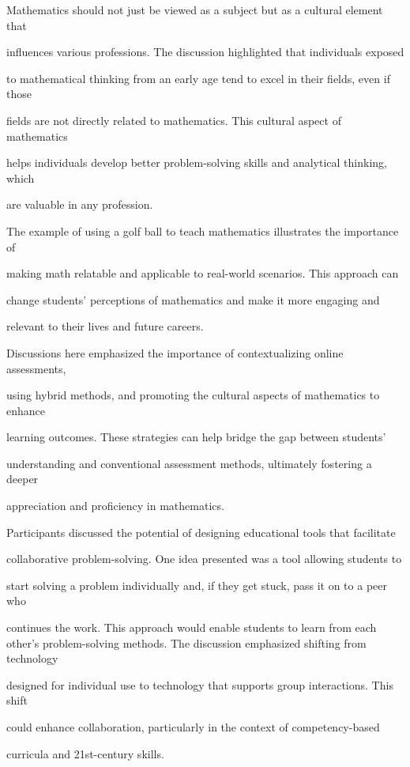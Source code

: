 \documentclass[11pt]{article}
\begin{document}
Mathematics should not just be viewed as a subject but as a cultural element that

influences various professions. The discussion highlighted that individuals exposed

to mathematical thinking from an early age tend to excel in their fields, even if those

fields are not directly related to mathematics. This cultural aspect of mathematics

helps individuals develop better problem-solving skills and analytical thinking, which

are valuable in any profession.

The example of using a golf ball to teach mathematics illustrates the importance of

making math relatable and applicable to real-world scenarios. This approach can

change students' perceptions of mathematics and make it more engaging and

relevant to their lives and future careers.

Discussions here emphasized the importance of contextualizing online assessments,

using hybrid methods, and promoting the cultural aspects of mathematics to enhance

learning outcomes. These strategies can help bridge the gap between students'

understanding and conventional assessment methods, ultimately fostering a deeper

appreciation and proficiency in mathematics.

Participants discussed the potential of designing educational tools that facilitate

collaborative problem-solving. One idea presented was a tool allowing students to

start solving a problem individually and, if they get stuck, pass it on to a peer who

continues the work. This approach would enable students to learn from each other's problem-solving methods. The discussion emphasized shifting from technology

designed for individual use to technology that supports group interactions. This shift

could enhance collaboration, particularly in the context of competency-based

curricula and 21st-century skills.
\end{document}
